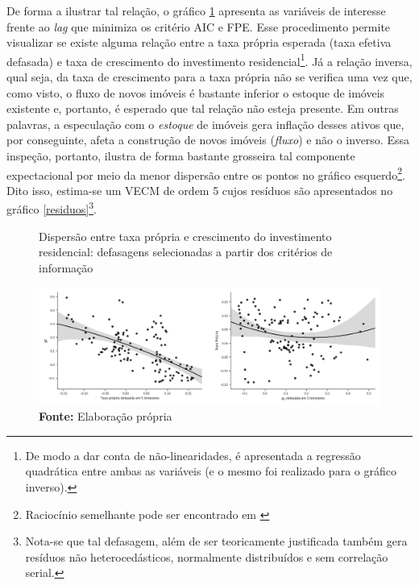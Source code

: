 De forma a ilustrar tal relação, o gráfico \ref{defasagens} apresenta as variáveis de interesse frente ao \textit{lag} que minimiza os critério AIC e FPE. Esse procedimento permite visualizar se existe alguma relação entre a taxa própria esperada (taxa efetiva defasada) e taxa de crescimento do investimento residencial\footnote{De modo a dar conta de não-linearidades, é apresentada a regressão quadrática entre ambas as variáveis (e o mesmo foi realizado para o gráfico inverso).}. Já a relação inversa, qual seja, da taxa de crescimento para a taxa própria não se verifica uma vez que, como visto, o fluxo de novos imóveis é bastante inferior o estoque de imóveis existente e, portanto, é esperado que tal relação não esteja presente. Em outras palavras, a especulação com o \textit{estoque}  de imóveis gera inflação desses ativos que, por conseguinte, afeta a construção de novos imóveis (\textit{fluxo}) e não o inverso. Essa inspeção, portanto, ilustra de forma bastante grosseira tal componente expectacional por meio da menor dispersão entre os pontos no gráfico esquerdo\footnote{Raciocínio semelhante pode ser encontrado em \textcite{girardi_autonomous_2015}}.  Dito isso,  estima-se um VECM de ordem 5 cujos resíduos são apresentados no gráfico \ref{residuos}\footnote{Nota-se que tal defasagem, além de ser teoricamente justificada também gera resíduos não heterocedásticos, normalmente distribuídos e sem correlação serial.}.

\begin{figure}[htb]
	\centering
	\caption{Dispersão entre taxa própria e crescimento do investimento residencial: defasagens selecionadas a partir dos critérios de informação}
	\label{defasagens}
	\includegraphics[width=\textwidth]{Fatos_Estilizados/Figs/Scatter_VECM.png}
	\caption*{\textbf{Fonte:} Elaboração própria}
\end{figure}


